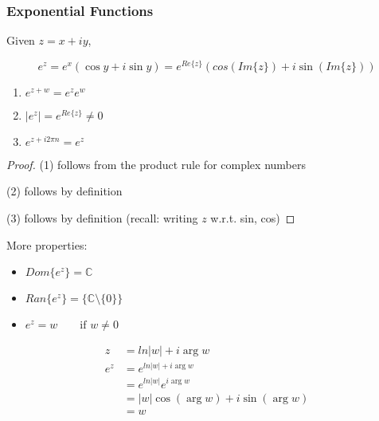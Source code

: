 \documentclass[../notes.tex]{subfiles}
\begin{document}
\subsubsection{Exponential Functions}

\begin{definition}

	Given $ z = x + iy $,

	\begin{equation}
		e^z = e^x (\cos y + i \sin y) = e ^{Re\{z\}}(cos(Im\{z\}) + i \sin(Im\{z\}))
	\end{equation}

	\begin{enumerate}
		\item $ e^{z+w} = e^z e^w $ 
		\item $ |e^{z} | = e^{Re\{z\}} \neq 0  $ 
		\item $e^{z + i 2\pi n } = e^{z} $
	\end{enumerate}
	
	\begin{proof}
		(1) follows from the product rule for complex numbers
	\item (2) follows by definition
	\item (3) follows by definition (recall: writing $ z $ w.r.t. sin, cos)
	\end{proof}
\end{definition}

	More properties:


	\begin{itemize}
		\item $ Dom\{e^z\} = \mathbb{C} $
		\item $ Ran\{e^z\} = \{\mathbb{C} \setminus \{0\}\}$  
		\item $  e^z = w \qquad \text{if } w \neq  0$ 
	\end{itemize}

	\begin{equation}
		\begin{split}
			z &= ln|w| + i \arg w \\
			e^z &=  e^{ln|w| + i \arg w} \\
					&= e^{ln|w|} e^{i \arg w} \\
					&=  |w| \cos(\arg w) + i \sin(\arg w) \\
					&= w \\ 
		\end{split}
	\end{equation}
\end{document}
